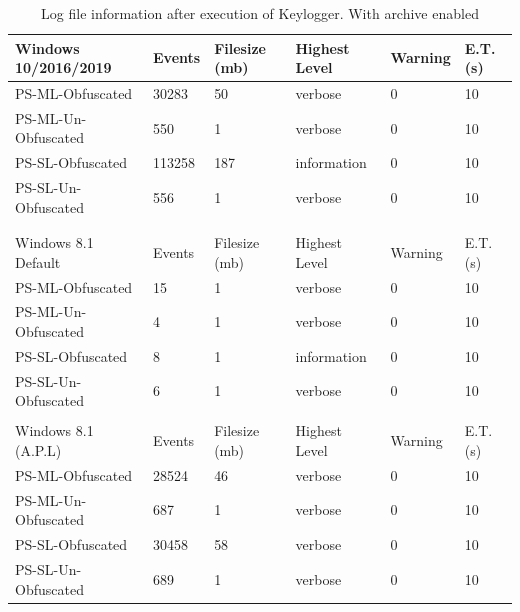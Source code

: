 \documentclass{article}%
\begin{document}
\begin{table}
\begin{center}
\caption {Log file information after execution of Keylogger. With archive enabled}
\label{tab:table_seven}
\begin{tabular}{|l|l|l|l|l|l|}\hline
Windows 10/2016/2019 & Events & Filesize (mb) & Highest Level & Warning & E.T. (s)  \\\hline
PS-ML-Obfuscated     & 30283  & 50              & verbose       & 0       & 10               \\\hline
PS-ML-Un-Obfuscated  & 550    & 1               & verbose       & 0       & 10               \\\hline
PS-SL-Obfuscated     & 113258 & 187             & information   & 0       & 10               \\\hline
PS-SL-Un-Obfuscated  & 556    & 1               & verbose       & 0       & 10               \\\hline
                     &        &                 &               &         &                  \\\hline
                     &        &                 &               &         &                  \\\hline
Windows 8.1 Default  & Events & Filesize (mb) & Highest Level & Warning & E.T. (s)  \\\hline
PS-ML-Obfuscated     & 15     & 1               & verbose       & 0       & 10               \\\hline
PS-ML-Un-Obfuscated  & 4      & 1               & verbose       & 0       & 10               \\\hline
PS-SL-Obfuscated     & 8      & 1               & information   & 0       & 10               \\\hline
PS-SL-Un-Obfuscated  & 6      & 1               & verbose       & 0       & 10               \\\hline
                     &        &                 &               &         &                  \\\hline
Windows 8.1 (A.P.L)  & Events & Filesize (mb) & Highest Level & Warning & E.T. (s)  \\\hline
PS-ML-Obfuscated     & 28524  & 46              & verbose       & 0       & 10               \\\hline
PS-ML-Un-Obfuscated  & 687    & 1               & verbose       & 0       & 10               \\\hline
PS-SL-Obfuscated     & 30458  & 58              & verbose       & 0       & 10               \\\hline
PS-SL-Un-Obfuscated  & 689    & 1               & verbose       & 0       & 10               \\\hline
\end{tabular}
\end{center}
\end{table}
\end{document}
